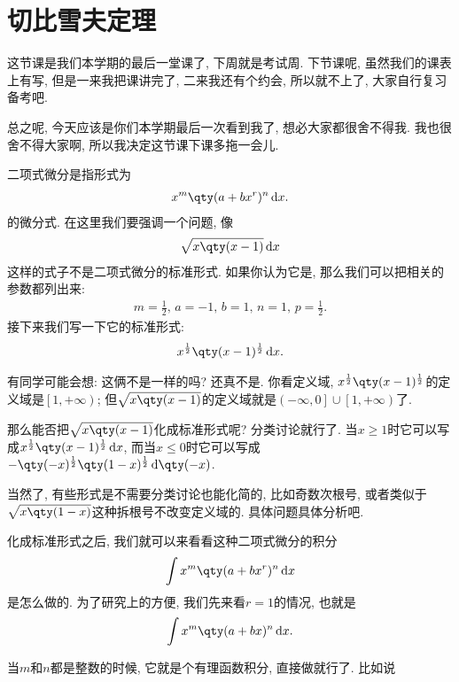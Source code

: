 \documentclass{ctexbook}
\newcommand*{\dif}{\mathop{}\!\mathrm{d}}
\begin{document}
{\section{切比雪夫定理}
这节课是我们本学期的最后一堂课了, 下周就是考试周. 下节课呢, 虽然我们的课表上有写, 但是一来我把课讲完了, 二来我还有个约会, 所以就不上了, 大家自行复习备考吧. \par
总之呢, 今天应该是你们本学期最后一次看到我了, 想必大家都很舍不得我. 我也很舍不得大家啊, 所以我决定这节课下课多拖一会儿. \par
二项式微分是指形式为
\begin{align*}
x^{m}\qty(a+bx^{r})^{n}\dif{x}
.\end{align*}
的微分式. 在这里我们要强调一个问题, 像
\begin{align*}
\sqrt{x\qty(x-1)}\dif{x}
\end{align*}
这样的式子不是二项式微分的标准形式. 如果你认为它是, 那么我们可以把相关的参数都列出来: 
\begin{align*}
m=\frac{1}{2},\,a=-1,\,b=1,\,n=1,\,p=\frac{1}{2}
.\end{align*}
接下来我们写一下它的标准形式: 
\begin{align*}
x^{\frac{1}{2}}\qty(x-1)^{\frac{1}{2}}\dif{x}
.\end{align*}\par
有同学可能会想: 这俩不是一样的吗? 还真不是. 你看定义域, $x^{\frac{1}{2}}\qty(x-1)^{\frac{1}{2}}$的定义域是$\left[1,+\infty\right)$; 但$\sqrt{x\qty(x-1)}$的定义域就是$\left(-\infty,0\right]\cup\left[1,+\infty\right)$了. \par
那么能否把$\sqrt{x\qty(x-1)}$化成标准形式呢? 分类讨论就行了. 当$x\ge1$时它可以写成$x^{\frac{1}{2}}\qty(x-1)^{\frac{1}{2}}\dif{x}$, 而当$x\le0$时它可以写成$-\qty(-x)^{\frac{1}{2}}\qty(1-x)^{\frac{1}{2}}\dif{\qty(-x)}$. \par
当然了, 有些形式是不需要分类讨论也能化简的, 比如奇数次根号, 或者类似于$\sqrt{x\qty(1-x)}$这种拆根号不改变定义域的. 具体问题具体分析吧. \par
化成标准形式之后, 我们就可以来看看这种二项式微分的积分
\begin{align*}
\int x^{m}\qty(a+bx^{r})^{n}\dif{x}
\end{align*}
是怎么做的. 为了研究上的方便, 我们先来看$r=1$的情况, 也就是
\begin{align*}
\int x^{m}\qty(a+bx)^{n}\dif{x}
.\end{align*}\par
当$m$和$n$都是整数的时候, 它就是个有理函数积分, 直接做就行了. 比如说
\begin{align*}

\end{align*}}
\end{document}
